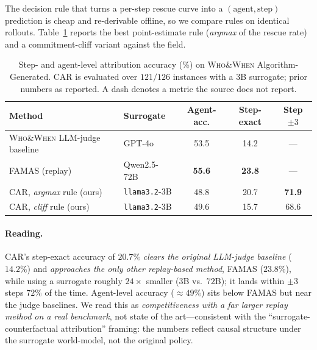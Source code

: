 \documentclass[11pt]{article}
\begin{document}
The decision rule that turns a per-step rescue curve into a $(\text{agent},\text{step})$ prediction
is cheap and re-derivable offline, so we compare rules on identical rollouts. Table~\ref{tab:bench}
reports the best point-estimate rule (\emph{argmax} of the rescue rate) and a commitment-cliff
variant against the field.

\begin{table}[t]
\centering
\small
\begin{tabular}{llccc}
\toprule
Method & Surrogate & Agent-acc. & Step-exact & Step $\pm3$ \\
\midrule
\textsc{Who\&When} LLM-judge baseline~\cite{whowhen} & GPT-4o & 53.5 & 14.2 & --- \\
FAMAS (replay)~\cite{famas} & Qwen2.5-72B & \textbf{55.6} & \textbf{23.8} & --- \\
\midrule
CAR, \emph{argmax} rule (ours) & \texttt{llama3.2}-3B & 48.8 & 20.7 & \textbf{71.9} \\
CAR, \emph{cliff} rule (ours) & \texttt{llama3.2}-3B & 49.6 & 15.7 & 68.6 \\
\bottomrule
\end{tabular}
\caption{Step- and agent-level attribution accuracy (\%) on \textsc{Who\&When} Algorithm-Generated.
CAR is evaluated over $121/126$ instances with a $3$B surrogate; prior numbers as reported. A dash
denotes a metric the source does not report.}
\label{tab:bench}
\end{table}

\paragraph{Reading.} CAR's step-exact accuracy of $20.7\%$ \emph{clears the original LLM-judge
baseline} ($14.2\%$) and \emph{approaches the only other replay-based method}, FAMAS ($23.8\%$),
while using a surrogate roughly $24\times$ smaller ($3$B vs.\ $72$B); it lands within $\pm3$ steps
$72\%$ of the time. Agent-level accuracy ($\approx49\%$) sits below FAMAS but near the judge
baselines. We read this as \emph{competitiveness with a far larger replay method on a real
benchmark}, not state of the art---consistent with the ``surrogate-counterfactual attribution''
framing: the numbers reflect causal structure under the surrogate world-model, not the original
policy.
\end{document}
